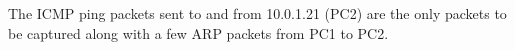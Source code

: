 The ICMP ping packets sent to and from 10.0.1.21 (PC2) are the only packets to be captured along with a few ARP packets from PC1 to PC2.